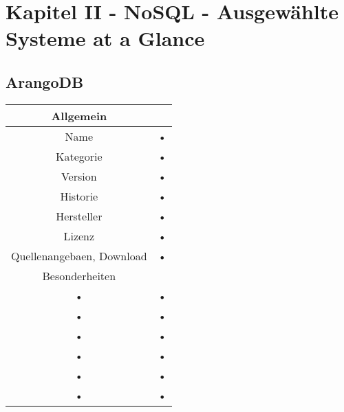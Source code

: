 \chapter{Kapitel II - NoSQL - Ausgewählte Systeme at a Glance}
\section{ArangoDB}
\begin{tabular}{|c|c|}
\hline 
Allgemein \\ 
\hline 
Name & • \\ 
\hline 
Kategorie & • \\ 
\hline 
Version & • \\ 
\hline 
Historie & • \\ 
\hline 
Hersteller & • \\ 
\hline 
Lizenz & • \\ 
\hline 
Quellenangebaen, Download & • \\ 
\hline 
Besonderheiten \\ 
\hline 
• & • \\ 
\hline 
• & • \\ 
\hline 
• & • \\ 
\hline 
• & • \\ 
\hline 
• & • \\ 
\hline 
• & • \\ 
\hline 
\end{tabular} 
